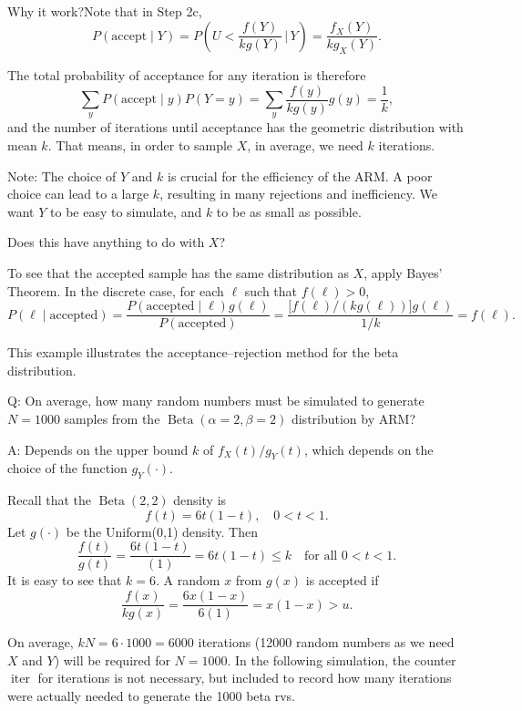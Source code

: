 \documentclass[
  letterpaper,
  DIV=11,
  numbers=noendperiod]{scrreprt}
\begin{document}
Why it work?Note that in Step 2c, \[
P(\text{accept} \mid Y) 
= P\!\left(U < \frac{f(Y)}{k g(Y)} \,\Big|\, Y\right) 
= \frac{f_X(Y)}{k g_X(Y)}.
\]

The total probability of acceptance for any iteration is therefore \[
\sum_y P(\text{accept} \mid y) P(Y = y) 
= \sum_y \frac{f(y)}{k g(y)} g(y) 
= \frac{1}{k},
\] and the number of iterations until acceptance has the geometric
distribution with mean \(k\). That means, in order to sample \(X\), in
average, we need \(k\) iterations.

Note: The choice of \(Y\) and \(k\) is crucial for the efficiency of the
ARM. A poor choice can lead to a large \(k\), resulting in many
rejections and inefficiency. We want \(Y\) to be easy to simulate, and
\(k\) to be as small as possible.

Does this have anything to do with \(X\)?

To see that the accepted sample has the same distribution as \(X\),
apply Bayes' Theorem. In the discrete case, for each \(\ell\) such that
\(f(\ell) > 0\), \[
P(\ell \mid \text{accepted}) 
= \frac{P(\text{accepted} \mid \ell) g(\ell)}{P(\text{accepted})} 
= \frac{\big[f(\ell)/(k g(\ell))\big] g(\ell)}{1/k} 
= f(\ell).
\]

This example illustrates the acceptance--rejection method for the beta
distribution.

Q: On average, how many random numbers must be simulated to generate
\(N=1000\) samples from the \(\operatorname{Beta}(\alpha=2,\beta=2)\)
distribution by ARM?

A: Depends on the upper bound \(k\) of \(f_X(t)/g_Y(t)\), which depends
on the choice of the function \(g_Y(\cdot)\).

Recall that the \(\operatorname{Beta}(2,2)\) density is \[
f(t) = 6t(1-t), \quad 0 < t < 1.
\] Let \(g(\cdot)\) be the Uniform(0,1) density. Then \[
\frac{f(t)}{g(t)} = \frac{6t(1-t)}{(1)} = 6t(1-t) \leq k \quad \text{for all } 0 < t < 1.
\] It is easy to see that \(k = 6\). A random \(x\) from \(g(x)\) is
accepted if \[
\frac{f(x)}{kg(x)} = \frac{6x(1-x)}{6(1)} = x(1-x) > u.
\]

On average, \(kN = 6\cdot 1000 =6000\) iterations (12000 random numbers
as we need \(X\) and \(Y\)) will be required for \(N=1000\). In the
following simulation, the counter \(\operatorname{iter}\) for iterations
is not necessary, but included to record how many iterations were
actually needed to generate the 1000 beta rvs.
\end{document}
